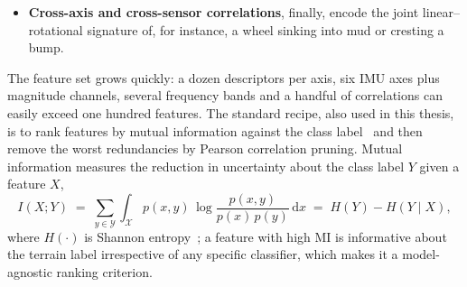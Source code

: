 \begin{itemize}
    Letting $\hat{X}(f)$ denote the discrete Fourier transform of the windowed signal and $S_{xx}(f) = |\hat{X}(f)|^{2}/N$ its periodogram estimate of the one-sided power spectral density~\cite{Welch1967}, the power in a band $[f_{\mathrm{lo}},\,f_{\mathrm{hi}}]$ is
    \begin{equation}
        P_{[f_{\mathrm{lo}},\,f_{\mathrm{hi}}]}(x)
          \;=\; \int_{f_{\mathrm{lo}}}^{f_{\mathrm{hi}}} S_{xx}(f)\,\mathrm{d}f.
        \label{eq:band-power}
    \end{equation}
    The spectral centroid $f_{\mathrm{c}}$ and the (normalised) spectral entropy $H_{\mathrm{s}}$ are computed from the same periodogram as
    \begin{equation}
        f_{\mathrm{c}}(x) = \frac{\sum_{f>0} f\, S_{xx}(f)}{\sum_{f>0} S_{xx}(f)},
        \qquad
        H_{\mathrm{s}}(x) = -\sum_{f>0} p(f)\log_{2} p(f),
        \quad p(f) = \frac{S_{xx}(f)}{\sum_{f'>0} S_{xx}(f')}.
        \label{eq:spectral}
    \end{equation}
    Jerk RMS, finally, captures the rate of change of acceleration; for a sampling period $T_{s}$ it is computed as
    \begin{equation}
        \mathrm{JerkRMS}(x)
          \;=\; \sqrt{\,\frac{1}{N-1}\sum_{n=1}^{N-1}\!\left(\frac{x[n]-x[n-1]}{T_{s}}\right)^{2}}.
        \label{eq:jerk-rms}
    \end{equation}

    \item \textbf{Cross-axis and cross-sensor correlations}, finally, encode the joint linear--rotational signature of, for instance, a wheel sinking into mud or cresting a bump.

\end{itemize}

The feature set grows quickly: a dozen descriptors per axis, six IMU axes plus magnitude channels, several frequency bands and a handful of correlations can easily exceed one hundred features. The standard recipe, also used in this thesis, is to rank features by mutual information against the class label~\cite{Vergara2014,Cover2006,Bao2004} and then remove the worst redundancies by Pearson correlation pruning. Mutual information measures the reduction in uncertainty about the class label $Y$ given a feature $X$,
\begin{equation}
    I(X;Y) \;=\; \sum_{y \in \mathcal{Y}} \int_{\mathcal{X}}
                p(x,y)\,\log\frac{p(x,y)}{p(x)\,p(y)}\,\mathrm{d}x
          \;=\; H(Y) - H(Y \mid X),
    \label{eq:mi}
\end{equation}
where $H(\cdot)$ is Shannon entropy~\cite{Cover2006}; a feature with high MI is informative about the terrain label irrespective of any specific classifier, which makes it a model-agnostic ranking criterion.

